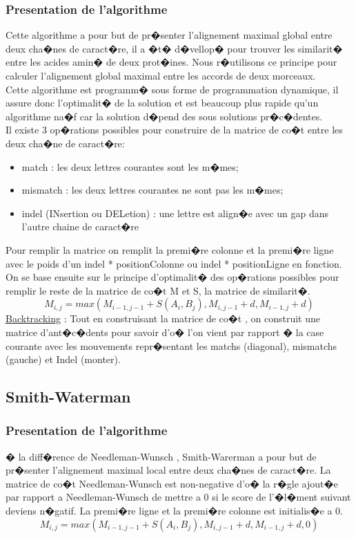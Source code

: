 \documentclass[12pt]{article}
\begin{document}
\subsubsection{Presentation de l'algorithme}
Cette algorithme a pour but de pr�senter l'alignement maximal global entre deux cha�nes de caract�re, il a �t� d�vellop�
pour trouver les similarit� entre les acides amin� de deux prot�ines. Nous r�utilisons ce principe pour calculer l'alignement global maximal entre les accords de deux morceaux.\\
Cette algorithme est programm� sous forme de programmation dynamique, il assure donc l'optimalit� de la solution et est beaucoup plus rapide qu'un algorithme na�f car la solution d�pend des sous solutions pr�c�dentes.\\
Il existe 3 op�rations possibles pour  construire de la matrice de co�t entre les deux cha�ne de caract�re:
 \begin{itemize}
\item match : les deux lettres courantes sont les m�mes;
\item mismatch : les deux lettres courantes ne sont pas les m�mes;
\item indel (INsertion ou DELetion) : une lettre est align�e avec un gap dans l'autre chaine de caract�re
\end{itemize}

Pour remplir la matrice on remplit la premi�re colonne et la premi�re ligne avec le poids d'un indel * positionColonne ou indel * positionLigne en fonction.
On se base ensuite sur le principe d'optimalit� des op�rations possibles pour remplir le reste de la matrice de co�t M et S, la matrice de similarit�.
\begin{equation*}
M_{i,j} = max(M_{i-1,j-1}+ S(A_{i},B_{j}),M_{i,j-1} + d , M_{i-1,j} + d)
\end{equation*}
\underline{Backtracking} :
Tout en construisant la matrice de co�t , on construit une matrice d'ant�c�dents pour savoir d'o� l'on vient par rapport � la case courante avec les mouvements repr�sentant les matchs (diagonal), mismatchs (gauche) et Indel (monter).

\subsection{Smith-Waterman}
\subsubsection{Presentation de l'algorithme}
� la diff�rence de Needleman-Wunsch , Smith-Warerman a pour but de pr�senter l'alignement maximal local entre deux cha�nes de caract�re. La matrice de co�t Needleman-Wunsch est non-negative d'o� la r�gle ajout�e par rapport a Needleman-Wunsch de mettre a 0 si le score de l'�l�ment suivant deviens n�gatif.
La premi�re ligne et la premi�re colonne est initialis�e a 0.
\begin{equation*}
M_{i,j} = max(M_{i-1,j-1}+ S(A_{i},B_{j}),M_{i,j-1} + d , M_{i-1,j} + d , 0)
\end{equation*}
\end{document}
